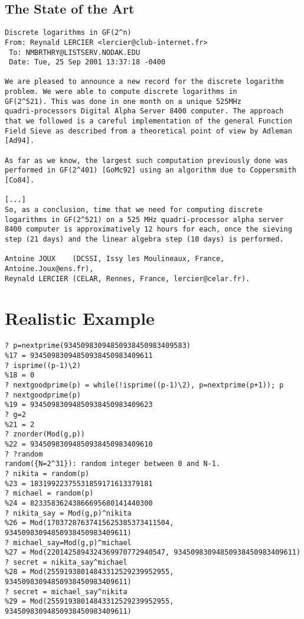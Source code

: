 \documentclass[11pt]{report}
\begin{document}
\subsection{The State of the Art}
\begin{verbatim}
Discrete logarithms in GF(2^n)
From: Reynald LERCIER <lercier@club-internet.fr>
 To: NMBRTHRY@LISTSERV.NODAK.EDU
 Date: Tue, 25 Sep 2001 13:37:18 -0400
 
We are pleased to announce a new record for the discrete logarithm
problem. We were able to compute discrete logarithms in
GF(2^521). This was done in one month on a unique 525MHz
quadri-processors Digital Alpha Server 8400 computer. The approach
that we followed is a careful implementation of the general Function
Field Sieve as described from a theoretical point of view by Adleman
[Ad94].

As far as we know, the largest such computation previously done was
performed in GF(2^401) [GoMc92] using an algorithm due to Coppersmith
[Co84]. 

[...]
So, as a conclusion, time that we need for computing discrete
logarithms in GF(2^521) on a 525 MHz quadri-processor alpha server
8400 computer is approximatively 12 hours for each, once the sieving
step (21 days) and the linear algebra step (10 days) is performed.

Antoine JOUX    (DCSSI, Issy les Moulineaux, France, Antoine.Joux@ens.fr),
Reynald LERCIER (CELAR, Rennes, France, lercier@celar.fr).
\end{verbatim}



\section{Realistic Example}

\begin{verbatim}
? p=nextprime(93450983094850938450983409583)
%17 = 93450983094850938450983409611
? isprime((p-1)\2)
%18 = 0
? nextgoodprime(p) = while(!isprime((p-1)\2), p=nextprime(p+1)); p
? nextgoodprime(p)
%19 = 93450983094850938450983409623
? g=2
%21 = 2
? znorder(Mod(g,p))
%22 = 93450983094850938450983409610
? ?random
random({N=2^31}): random integer between 0 and N-1.
? nikita = random(p)
%23 = 18319922375531859171613379181
? michael = random(p)
%24 = 82335836243866695680141440300
? nikita_say = Mod(g,p)^nikita
%26 = Mod(17037287637415625385373411504, 93450983094850938450983409611)
? michael_say=Mod(g,p)^michael
%27 = Mod(2201425894324369970772940547, 93450983094850938450983409611)
? secret = nikita_say^michael
%28 = Mod(25591938014843312529239952955, 93450983094850938450983409611)
? secret = michael_say^nikita
%29 = Mod(25591938014843312529239952955, 93450983094850938450983409611)
\end{verbatim}
\end{document}
